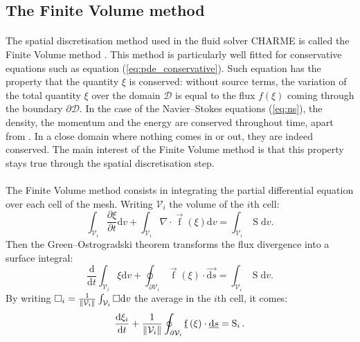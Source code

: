     \subsection{The Finite Volume method}

      \paragraph{}
      The spatial discretisation method used in the fluid solver CHARME is called the Finite Volume method \cite{EymardGallouetHerbin2000, Leterrier2003}.
      This method is particularly well fitted for conservative equations such as equation (\ref{eq:pde_conservative}).
      Such equation has the property that the quantity $\xi$ is conserved: without source terms, the variation of the total quantity $\xi$ over the domain $\mathcal{D}$ is equal to the flux $f\left(\xi\right)$ coming through the boundary $\partial\mathcal{D}$.
      In the case of the Navier--Stokes equations (\ref{eq:ns}), the density, the momentum and the energy are conserved throughout time, apart from .
      In a close domain where nothing comes in or out, they are indeed conserved.
      The main interest of the Finite Volume method is that this property stays true through the spatial discretisation step.

      \paragraph{}
      The Finite Volume method consists in integrating the partial differential equation over each cell of the mesh.
      Writing $\mathcal{V}_i$ the volume of the $i$th cell:
      \begin{equation}
        \int_{\mathcal{V}_i} \frac{\partial \xi}{\partial t} \mathrm{d}v + \int_{\mathcal{V}_i} \nabla\cdot \vec{\operatorname{f}}\left(\xi\right) \mathrm{d}v = \int_{\mathcal{V}_i} \operatorname{S} \mathrm{d}v .
      \end{equation}
      Then the Green--Ostrogradski theorem transforms the flux divergence into a surface integral:
      \begin{equation}
        \frac{\mathrm{d}}{\mathrm{d} t} \int_{\mathcal{V}_i} \xi\mathrm{d}v + \oint_{\partial\mathcal{V}_i} \vec{\operatorname{f}}\left(\xi\right) \cdot \vec{\mathrm{d}s} = \int_{\mathcal{V}_i} \operatorname{S} \mathrm{d}v .
      \end{equation}
      By writing $\square_i = \frac{1}{\norm{\mathcal{V}_i}} \int_{\mathcal{V}_i} \square \mathrm{d}v$ the average in the $i$th cell, it comes:
      \begin{equation}
        \frac{\mathrm{d}\xi_i}{\mathrm{d} t}  + \frac{1}{\norm{\mathcal{V}_i}} \oint_{\partial\mathcal{V}_i} \vec{\operatorname{f}}\left(\xi\right) \cdot \vec{\mathrm{d}s} = \operatorname{S}_i .
      \end{equation}

